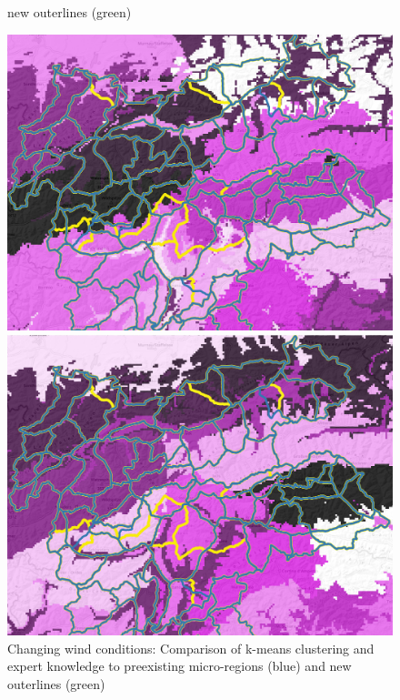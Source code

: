 \begin{figure}[ht]
\begin{minipage}[b]{0.48\linewidth}
{      new outerlines (green)} 
      \vspace{4ex}
      \hspace{4ex}
    \end{minipage} 
    \begin{minipage}[b]{0.48\linewidth}
      \centering
      \includegraphics[width=0.9\linewidth]{Figures/figures_snowgrid/new_regions/new_regions_west_15.png} 
      \caption{West blocking: Comparison of k-means clustering and expert knowledge to preexisting micro-regions (blue) and
      new outerlines (green)} 
      \vspace{4ex}
      \hspace{4ex}
    \end{minipage}%
    \begin{minipage}[b]{0.48\linewidth}
      \centering
      \includegraphics[width=0.9\linewidth]{Figures/figures_snowgrid/new_regions/new_regions_undef_15.png} 
      \caption{Changing wind conditions: Comparison of k-means clustering and expert knowledge to preexisting micro-regions (blue) and
      new outerlines (green)} 
      \vspace{4ex}
      \hspace{4ex}
    \end{minipage} 
  \end{figure}

